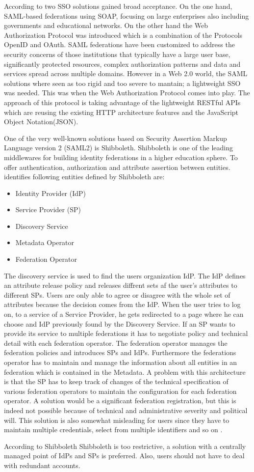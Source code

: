 According to \cite{Lynch:2017:IIG} two SSO solutions gained broad acceptance. On the one hand, SAML-based federations using SOAP, focusing on large enterprises also including governments and educational networks. On the other hand the Web Authorization Protocol was introduced which is a combination of the Protocols OpenID and OAuth. SAML federations have been customized to address the security concerns of those institutions that typically have a large user base, significantly protected resources, complex authorization patterns and data and services spread across multiple domains. However in a Web 2.0 world, the SAML solutions where seen as too rigid and too severe to mantain; a lightweight SSO was needed. This was when the Web Authorization Protocol comes into play. The approach of this protocol is taking advantage of the lightweight RESTful APIs which are reusing the existing HTTP architecture features and the JavaScript Object Notation(JSON).

One of the very well-known solutions based on Security Assertion Markup Language version 2 (SAML2) is Shibboleth. Shibboleth is one of the leading middlewares for building identity federations in a higher education sphere. To offer authentication, authorization and attribute assertion between entities. \cite{Prochazka:2010:UCA} identifies following entities defined by Shibboleth are:

\begin{itemize}
	\item Identity Provider (IdP)
	\item Service Provider (SP)
	\item Discovery Service
	\item Metadata Operator
	\item Federation Operator
\end{itemize}

 The discovery service is used to find the users organization IdP. The IdP defines an attribute release policy and releases diffrent sets af the user's attributes to different SPs. Users are only able to agree or disagree with the whole set of attributes because the decision comes from the IdP. When the user tries to log on, to a service of a Service Provider, he gets redirected to a page where he can choose and IdP previously found by the Discovery Service. If an SP wants to provide its service to multiple federations it has to negotiate policy and technical detail with each federation operator. The federation operator manages the federation policies and introduces SPs and IdPs. Furthermore the federations operator has to maintain and manage the information about all entities in an federation which is contained in the Metadata. A problem with this architecture is that the SP has to keep track of changes of the technical specification of various federation operators to maintain the configuration for each federation operator. A solution would be a significant federation registration, but this is indeed not possible because of technical and administrative severity and political will. This solution is also somewhat misleading for users since they have to maintain multiple credentials, select from multiple identifiers and so on \cite{Prochazka:2010:UCA}.
 
 According to \cite{Prochazka:2010:UCA} Shibboleth Shibboleth is too restrictive, a solution with a centrally managed point of IdPs and SPs is preferred. Also, users should not have to deal with redundant accounts.





\chapterend